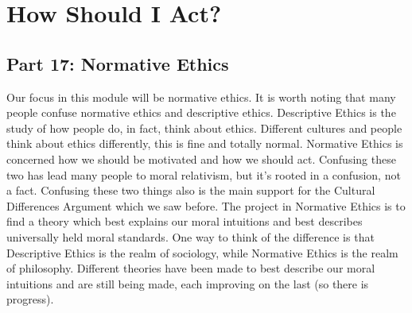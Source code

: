 \part{How Should I Act?}
\label{ch.modeight}
\chapter{Part 17: Normative Ethics}
Our focus in this module will be normative ethics. It is worth noting that many people confuse normative ethics and descriptive ethics. Descriptive Ethics is the study of how people do, in fact, think about ethics. Different cultures and people think about ethics differently, this is fine and totally normal. Normative Ethics is concerned how we should be motivated and how we should act. Confusing these two has lead many people to moral relativism, but it's rooted in a confusion, not a fact. Confusing these two things also is the main support for the Cultural Differences Argument which we saw before. The project in Normative Ethics is to find a theory which best explains our moral intuitions and best describes universally held moral standards. One way to think of the difference is that Descriptive Ethics is the realm of sociology, while Normative Ethics is the realm of philosophy.  Different theories have been made to best describe our moral intuitions and are still being made, each improving on the last (so there is progress). 
